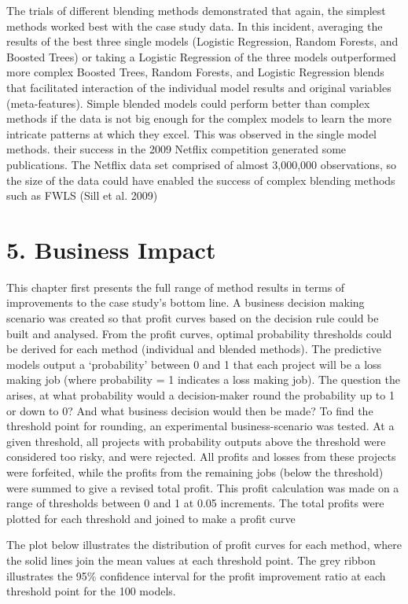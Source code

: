 \documentclass[]{elsarticle} %
\begin{document}
The trials of different blending methods demonstrated that again, the
simplest methods worked best with the case study data. In this incident,
averaging the results of the best three single models (Logistic
Regression, Random Forests, and Boosted Trees) or taking a Logistic
Regression of the three models outperformed more complex Boosted Trees,
Random Forests, and Logistic Regression blends that facilitated
interaction of the individual model results and original variables
(meta-features). Simple blended models could perform better than complex
methods if the data is not big enough for the complex models to learn
the more intricate patterns at which they excel. This was observed in
the single model methods. their success in the 2009 Netflix competition
generated some publications. The Netflix data set comprised of almost
3,000,000 observations, so the size of the data could have enabled the
success of complex blending methods such as FWLS (Sill et al. 2009)

\section{5. Business Impact}\label{business-impact}

This chapter first presents the full range of method results in terms of
improvements to the case study's bottom line. A business decision making
scenario was created so that profit curves based on the decision rule
could be built and analysed. From the profit curves, optimal probability
thresholds could be derived for each method (individual and blended
methods). The predictive models output a `probability' between 0 and 1
that each project will be a loss making job (where probability = 1
indicates a loss making job). The question the arises, at what
probability would a decision-maker round the probability up to 1 or down
to 0? And what business decision would then be made? To find the
threshold point for rounding, an experimental business-scenario was
tested. At a given threshold, all projects with probability outputs
above the threshold were considered too risky, and were rejected. All
profits and losses from these projects were forfeited, while the profits
from the remaining jobs (below the threshold) were summed to give a
revised total profit. This profit calculation was made on a range of
thresholds between 0 and 1 at 0.05 increments. The total profits were
plotted for each threshold and joined to make a profit curve

The plot below illustrates the distribution of profit curves for each
method, where the solid lines join the mean values at each threshold
point. The grey ribbon illustrates the 95\% confidence interval for the
profit improvement ratio at each threshold point for the 100 models.
\end{document}
